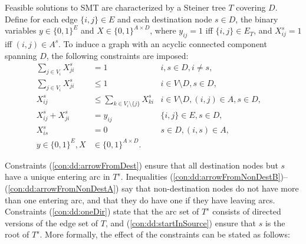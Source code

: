 Feasible solutions to SMT are characterized by a Steiner tree $T$ covering $D$.
Define for each edge $\{i,j\}\in E$ and each destination node $s\in D$, the binary variables $y\in\{0,1\}^E$ and $X\in\{0,1\}^{A\times D}$,
where $y_{ij}=1$ iff $\{i,j\} \in E_T$,
and $X^{s}_{ij}=1$ iff $(i,j)\in A^s$.
% 
To induce a graph with an acyclic connected component spanning $D$, the following constraints are imposed:
\begin{subequations}\label{mod:x0}
\begin{align}
\label{con:dd:arrowFromDest} \sum\limits_{j\in V_i}X^s_{ji} & = 1 & i,s\in D,i\neq s,\\
\label{con:dd:arrowFromNonDestB} \sum\limits_{j\in V_{i}}X^s_{ji} & \leq 1 & i\in V \setminus D, s\in D,\\
\label{con:dd:arrowFromNonDestA} X^s_{ij} & \leq \sum\limits_{k\in V_{i}\setminus \{j\}}X^s_{ki} & i\in V \setminus D,(i,j)\in A, s\in D,\\
\label{con:dd:oneDir} X^s_{ij} + X^s_{ji} & = y_{ij} & \{i,j\}\in E, s\in D,\\
\label{con:dd:startInSource} X^s_{is} & = 0 &  s\in D, (i,s)\in A,&\\
\label{con:dd:vardim}y \in \{0,1\}^{E}, X & \in \{0,1\}^{A\times D}.
\end{align}~
\end{subequations}

Constraints (\ref{con:dd:arrowFromDest}) ensure that all destination nodes but $s$ have a unique entering arc in $T^s$.
Inequalities (\ref{con:dd:arrowFromNonDestB})--(\ref{con:dd:arrowFromNonDestA})
say that non-destination nodes do not have more than one entering arc, and that they do have one if they have leaving arcs.
Constraints (\ref{con:dd:oneDir}) state that the arc set of $T^s$ consists of directed versions of the edge set of $T$,
and (\ref{con:dd:startInSource}) ensure that $s$ is the root of $T^s$.
More formally, the effect of the constraints can be stated as follows:

